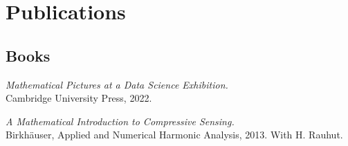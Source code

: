 \documentclass[11pt]{article}
\begin{document}
%


\section{Publications}

\subsection{Books}
\betaremune
\item{\sl Mathematical Pictures at a Data Science Exhibition.}\\
Cambridge University Press, 2022. 
\item {\sl A Mathematical Introduction to Compressive Sensing.}\\
Birkh\"auser, Applied and Numerical Harmonic Analysis, 2013.  With H. Rauhut.
\eetaremune

\end{document}
